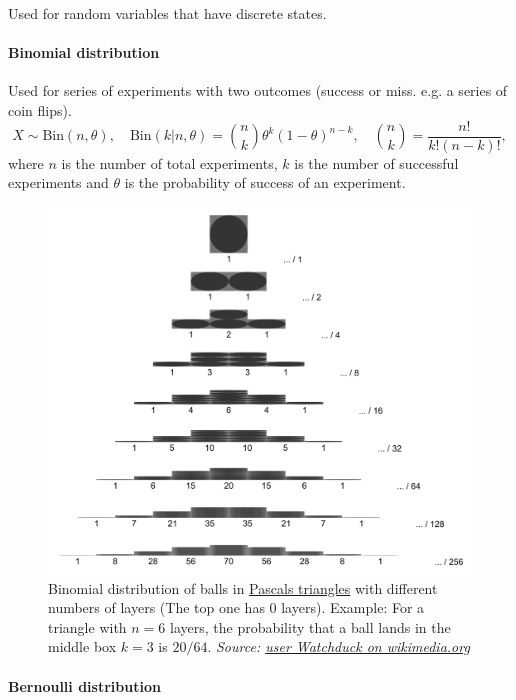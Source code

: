 \documentclass[
]{book}
\begin{document}
Used for random variables that have discrete states.

\hypertarget{binomial-distribution}{%
\paragraph{Binomial distribution}\label{binomial-distribution}}

Used for series of experiments with two outcomes (success or miss. e.g.
a series of coin flips).
\[X \sim \text{Bin}(n, \theta ), \quad \text{Bin}(k|n,\theta)={n \choose k} \theta^k (1-\theta)^{n-k} , \quad {n \choose k} = \frac{n!}{k!(n-k)!},\]
where \(n\) is the number of total experiments, \(k\) is the number of
successful experiments and \(\theta\) is the probability of success of an
experiment.

\begin{figure}
\centering
\includegraphics{./figures/Pascals_triangle_binomial_distribution.png}
\caption{Binomial distribution of balls in \href{https://en.wikipedia.org/wiki/Pascal\%27s_triangle}{Pascals
triangles} with
different numbers of layers (The top one has 0 layers). Example: For a
triangle with \(n=6\) layers, the probability that a ball lands in the
middle box \(k=3\) is \(20/64\). \emph{Source: \href{https://commons.wikimedia.org/wiki/File:Pascal\%27s_triangle;_binomial_distribution.svg}{user Watchduck on
wikimedia.org}}}
\end{figure}

\hypertarget{bernoulli-distribution}{%
\paragraph{Bernoulli distribution}\label{bernoulli-distribution}}
\end{document}
